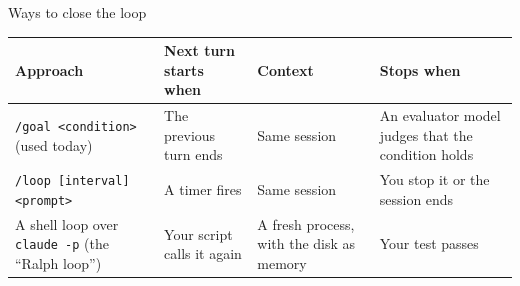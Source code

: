 \documentclass[aspectratio=169,10pt]{beamer}
\newcommand{\emphc}[1]{\textcolor{harvardcrimson}{#1}}
\begin{document}
\begin{frame}{Ways to close the loop}
\begin{center}
\small
\renewcommand{\arraystretch}{1.5}
\begin{tabular}{@{}>{\raggedright\arraybackslash}p{3.7cm} >{\raggedright\arraybackslash}p{2.9cm} >{\raggedright\arraybackslash}p{2.9cm} >{\raggedright\arraybackslash}p{3.4cm}@{}}
\toprule
\textbf{Approach} & \textbf{Next turn starts when} & \textbf{Context} & \textbf{Stops when} \\
\midrule
\emphc{\texttt{/goal <condition>}} (used today) & The previous turn ends & Same session & An evaluator model judges that the condition holds \\
\texttt{/loop [interval] <prompt>} & A timer fires & Same session & You stop it or the session ends \\
A shell loop over \texttt{claude -p} (the ``Ralph loop'') & Your script calls it again & A fresh process, with the disk as memory & Your test passes \\
\bottomrule
\end{tabular}
\end{center}
\end{frame}
\end{document}
